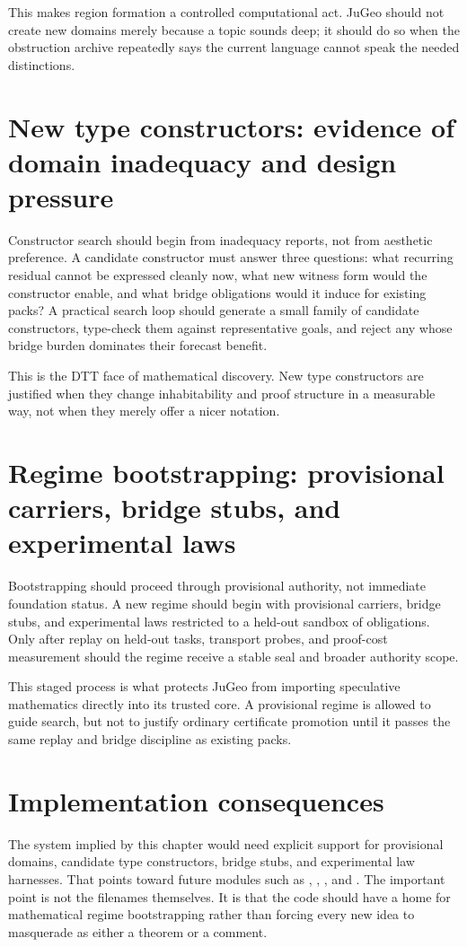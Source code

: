 \documentclass[11pt]{report}
\begin{document}
This makes region formation a controlled computational act. JuGeo should not create new domains merely because a topic sounds deep; it should do so when the obstruction archive repeatedly says the current language cannot speak the needed distinctions.

\section{New type constructors: evidence of domain inadequacy and design pressure}
Constructor search should begin from inadequacy reports, not from aesthetic preference. A candidate constructor must answer three questions: what recurring residual cannot be expressed cleanly now, what new witness form would the constructor enable, and what bridge obligations would it induce for existing packs? A practical search loop should generate a small family of candidate constructors, type-check them against representative goals, and reject any whose bridge burden dominates their forecast benefit.

This is the DTT face of mathematical discovery. New type constructors are justified when they change inhabitability and proof structure in a measurable way, not when they merely offer a nicer notation.

\section{Regime bootstrapping: provisional carriers, bridge stubs, and experimental laws}
Bootstrapping should proceed through provisional authority, not immediate foundation status. A new regime should begin with provisional carriers, bridge stubs, and experimental laws restricted to a held-out sandbox of obligations. Only after replay on held-out tasks, transport probes, and proof-cost measurement should the regime receive a stable seal and broader authority scope.

This staged process is what protects JuGeo from importing speculative mathematics directly into its trusted core. A provisional regime is allowed to guide search, but not to justify ordinary certificate promotion until it passes the same replay and bridge discipline as existing packs.

\section{Implementation consequences}
The system implied by this chapter would need explicit support for provisional domains, candidate type constructors, bridge stubs, and experimental law harnesses. That points toward future modules such as \texttt{}, \texttt{}, \texttt{}, and \texttt{}. The important point is not the filenames themselves. It is that the code should have a home for mathematical regime bootstrapping rather than forcing every new idea to masquerade as either a theorem or a comment.
\end{document}
